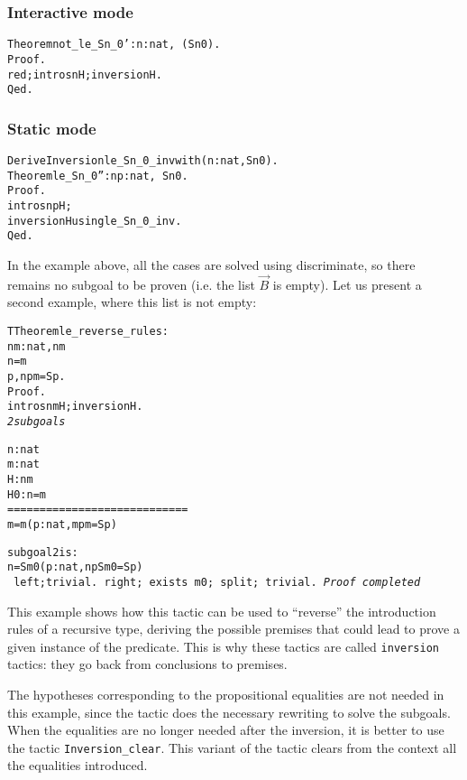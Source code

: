 \documentclass[11pt]{article}
\begin{document}
\subsubsection{Interactive mode}

\begin{alltt}
Theorem not_le_Sn_0' : {\prodsym} n:nat, ~ (S n {\coqle} 0).
Proof.
 red; intros n H ; inversion H.
Qed.
\end{alltt}


\subsubsection{Static mode}

\begin{alltt}

Derive Inversion le_Sn_0_inv with ({\prodsym} n :nat, S n {\coqle}  0).
Theorem le_Sn_0'' : {\prodsym} n p : nat, ~ S n {\coqle} 0 .
Proof.
 intros n p H;
 inversion H using le_Sn_0_inv.
Qed.
\end{alltt}


In the example above, all the cases are solved using discriminate, so
there remains no subgoal to be proven (i.e. the list $\vec{B}$ is
empty). Let us present a second example, where this list is not empty:


\begin{alltt}
TTheorem le_reverse_rules :
     {\prodsym} n m:nat, n {\coqle} m {\arrow}
                     n = m {\coqor}
                     {\exsym} p, n {\coqle}  p {\coqand} m = S p.
Proof.
 intros n m H; inversion H.
\it
2 subgoals




  n : nat
  m : nat
  H : n {\coqle} m
  H0 : n = m
  ============================
   m = m {\coqor} ({\exsym} p : nat, m {\coqle} p {\coqand} m = S p)

subgoal 2 is:
 n = S m0 {\coqor} ({\exsym} p : nat, n {\coqle} p {\coqand} S m0 = S p)
\tt
 left;trivial.
 right; exists m0; split; trivial.
\it
Proof completed
\end{alltt}

This example shows how this tactic can be used to ``reverse'' the
introduction rules of a recursive type, deriving the possible premises
that could lead to prove a given instance of the predicate. This is
why these tactics are called \texttt{inversion} tactics: they go back
from conclusions to premises.

The hypotheses corresponding to the propositional equalities are not
needed in this example, since the tactic does the necessary rewriting
to solve the subgoals.  When the equalities are no longer needed after
the inversion, it is better to use the tactic
\texttt{Inversion\_clear}. This variant of the tactic clears from the
context all the equalities introduced.
\end{document}
